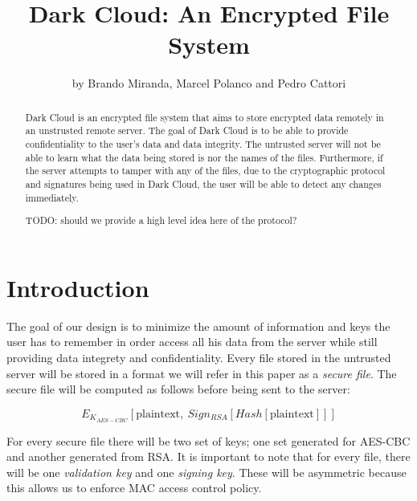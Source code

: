 \documentclass[a4paper]{article}
\title{Dark Cloud: An Encrypted File System}
\author{by Brando Miranda, Marcel Polanco and Pedro Cattori}
\begin{document}
\maketitle

\begin{abstract}
Dark Cloud is an encrypted file system that aims to store encrypted data remotely in an unstrusted remote server. 
The goal of Dark Cloud is to be able to provide confidentiality to the user's data and data integrity. 
The untrusted server will not be able to learn what the data being stored is nor the names of the files. 
Furthermore, if the server attempts to tamper with any of the files, due to the cryptographic protocol and signatures being used in Dark Cloud, the user will be able to detect any changes immediately.

TODO: should we provide a high level idea here of the protocol?

\end{abstract}

\section{Introduction}

The goal of our design is to minimize the amount of information and keys the user has to remember in order access all his data from the server while still providing data integrety and confidentiality. 
Every file stored in the untrusted server will be stored in a format we will refer in this paper as a {\it secure file}\footnotemark[1]. 
The secure file will be computed as follows before being sent to the server:


\begin{equation}
E_{K_{AES-CBC}}[\text{plaintext} , \ Sign_{RSA} [Hash[\text{plaintext}] ] ] \tag{1}\label{eq:simple}
\end{equation}


For every secure file there will be two set of keys; one set generated for AES-CBC and another generated from RSA.
It is important to note that for every file, there will be one {\it validation key} and one {\it signing key}. 
These will be asymmetric because this allows us to enforce MAC access control policy.
\end{document}

